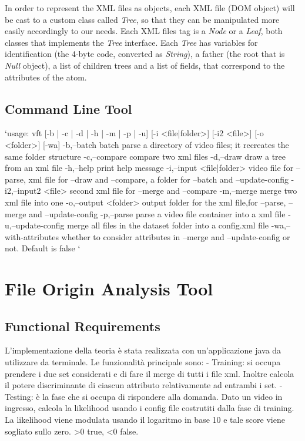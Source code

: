In order to represent the XML files as objects, each XML file (DOM object) will be cast to a custom class called \emph{Tree}, so that they can be manipulated more easily accordingly to our needs. Each XML files tag is a \emph{Node} or a \emph{Leaf}, both classes that implements the \emph{Tree} interface. Each \emph{Tree} has variables for identification (the 4-byte code, converted as \emph{String}), a father (the root that is \emph{Null} object), a list of children trees and a list of fields, that correspond to the attributes of the atom.

\subsection{Command Line Tool}

`usage: vft [-b | -c | -d | -h | -m | -p | -u]    [-i <file|folder>] [-i2
       <file>]  [-o <folder>]   [-wa]
 -b,--batch                 batch parse a directory of video files; it
                            recreates the same folder structure
 -c,--compare               compare two xml files
 -d,--draw                  draw a tree from an xml file
 -h,--help                  print help message
 -i,--input <file|folder>   video file for --parse, xml file for --draw
                            and --compare, a folder for --batch and
                            --update-config
 -i2,--input2 <file>        second xml file for --merge and --compare
 -m,--merge                 merge two xml file into one
 -o,--output <folder>       output folder for the xml file,for --parse,
                            --merge and --update-config
 -p,--parse                 parse a video file container into a xml file
 -u,--update-config         merge all files in the dataset folder into a
                            config.xml file
 -wa,--with-attributes      whether to consider attributes in --merge and
                            --update-config or not. Default is false
`


\section{File Origin Analysis Tool}

\subsection{Functional Requirements}

L'implementazione della teoria è stata realizzata con un'applicazione java da utilizzare da terminale. Le funzionalità principale sono:
- Training: si occupa prendere i due set considerati e di fare il merge di tutti i file xml. Inoltre calcola il potere discriminante di ciascun attributo relativamente ad entrambi i set.
- Testing: è la fase che si occupa di rispondere alla domanda. Dato un video in ingresso, calcola la likelihood usando i config file costrutiti dalla fase di training. La likelihood viene modulata usando il logaritmo in base 10 e tale score viene sogliato sullo zero. >0 true, <0 false.

